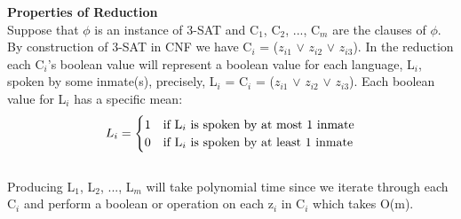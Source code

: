\documentclass[10pt]{csc_assignment}
\begin{document}
\begin{description}
\textbf{Properties of Reduction}\\
Suppose that $\phi$ is an instance of 3-SAT and C$_{1}$, C$_{2}$, ..., C$_{m}$ are the clauses of $\phi$. By construction of 3-SAT in CNF we have C$_{i}$ = ($z_{i1}$ $\lor$ $z_{i2}$ $\lor$ $z_{i3}$). In the reduction each C$_{i}$'s boolean value will represent a boolean value for each language, L$_{i}$, spoken by some inmate(s), precisely, L$_{i}$ = C$_{i}$ = ($z_{i1}$ $\lor$ $z_{i2}$ $\lor$ $z_{i3}$). Each boolean value for L$_{i}$ has a specific mean:
\[
L_{i} = 
\begin{cases} 
      \hfill 1 \hfill & \text{if L$_{i}$ is spoken by at most 1 inmate} \\
      \hfill 0 \hfill & \text{if L$_{i}$ is spoken by at least 1 inmate} \\
  \end{cases}
\]\\
Producing L$_{1}$, L$_{2}$, ..., L$_{m}$ will take polynomial time since we iterate through each C$_{i}$ and perform a boolean or operation on each z$_{i}$ in C$_{i}$ which takes O(m).\\


\end{description}
\end{document}
